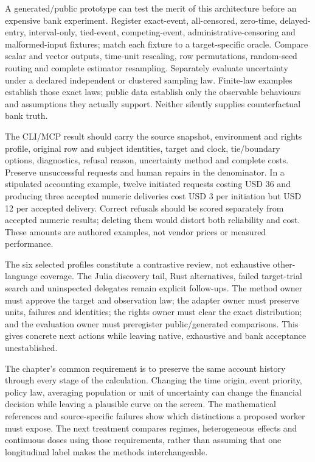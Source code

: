 A generated/public prototype can test the merit of this architecture before an
expensive bank experiment. Register exact-event, all-censored, zero-time, delayed-entry,
interval-only, tied-event, competing-event, administrative-censoring and malformed-input
fixtures; match each fixture to a target-specific oracle. Compare scalar and vector
outputs, time-unit rescaling, row permutations, random-seed routing and complete
estimator resampling. Separately evaluate uncertainty under a declared independent
or clustered sampling law. Finite-law examples establish those exact laws; public
data establish only the observable behaviours and assumptions they actually support.
Neither silently supplies counterfactual bank truth.

The CLI/MCP result should carry the source snapshot, environment and rights profile,
original row and subject identities, target and clock, tie/boundary options, diagnostics,
refusal reason, uncertainty method and complete costs. Preserve unsuccessful requests
and human repairs in the denominator. In a stipulated accounting example, twelve
initiated requests costing USD 36 and producing three accepted numeric deliveries
cost USD 3 per initiation but USD 12 per accepted delivery. Correct refusals should
be scored separately from accepted numeric results; deleting them would distort
both reliability and cost. These amounts are authored examples, not vendor prices
or measured performance.~\citep{exec24_survivalother_reference}

The six selected profiles constitute a contrastive review, not exhaustive
other-language coverage. The Julia discovery tail, Rust alternatives, failed
target-trial search and uninspected delegates remain explicit follow-ups. The method
owner must approve the target and observation law; the adapter owner must preserve
units, failures and identities; the rights owner must clear the exact distribution;
and the evaluation owner must preregister public/generated comparisons. This gives
concrete next actions while leaving native, exhaustive and bank acceptance unestablished.


The chapter's common requirement is to preserve the same account history
through every stage of the calculation. Changing the time origin, event
priority, policy law, averaging population or unit of uncertainty can change
the financial decision while leaving a plausible curve on the screen. The
mathematical references and source-specific failures show which distinctions
a proposed worker must expose. The next treatment compares regimes,
heterogeneous effects and continuous doses using those requirements, rather
than assuming that one longitudinal label makes the methods interchangeable.

